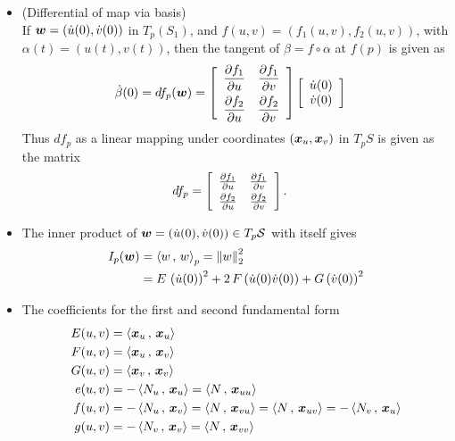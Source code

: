 \documentclass[11pt]{article}
\begin{document}
\begin{itemize}
\item (Differential of map via basis)\\
 If $\boldsymbol{w} = (\dot{u}(0), \dot{v}(0))$ in $T_{p}(S_{1})$,  and $f(u,v) = (f_{1}(u,v), f_{2}(u,v))$, with $\alpha(t) = (u(t), v(t))$, then the tangent of $\beta = f \circ \alpha$ at $f(p)$ is given as 
\begin{align}
 \dot{\beta}(0)= df_{p}(\boldsymbol{w}) &= \left[\begin{array}{cc}
 \dfrac{\partial f_{1}}{ \partial u} & \dfrac{\partial f_{1}}{ \partial v} \\ [8pt]
 \dfrac{\partial f_{2}}{ \partial u} & \dfrac{\partial f_{2}}{ \partial v}
 \end{array} \right] \left[\begin{array}{c}
 \dot{u}(0) \\ 
 \dot{v}(0)
 \end{array} \right] \label{eqn: diff_map_coord}
\end{align}
Thus $df_{p}$ as a linear mapping under coordinates $(\boldsymbol{x}_{u}, \boldsymbol{x}_{v})$ in $T_{p}S$ is given as the matrix 
\begin{align*}
df_{p}  &= \left[\begin{array}{cc}
 \frac{\partial f_{1}}{ \partial u} & \frac{\partial f_{1}}{ \partial v} \\[3pt] 
 \frac{\partial f_{2}}{ \partial u} & \frac{\partial f_{2}}{ \partial v}
 \end{array} \right].
\end{align*} \vspace{15pt}

\item The inner product of $\boldsymbol{w} = (\dot{u}(0), \dot{v}(0)) \in T_{p}{\mathcal S}$ with itself gives
\begin{align*}
I_{p}(\boldsymbol{w}) &= \left\langle w\,,\, w \right\rangle_{p} = \left\|w\right\|_{2}^{2}\\
&= E\,\left(\dot{u}(0)\right)^{2} + 2\,F\left(\dot{u}(0)\dot{v}(0)\right) + G\left(\dot{v}(0)\right)^{2}
\end{align*}




\item The coefficients for the first and second fundamental form
\begin{align}
E(u,v) &= \left\langle \boldsymbol{x}_{u}\,,\, \boldsymbol{x}_{u} \right\rangle \nonumber\\
F(u,v) &= \left\langle \boldsymbol{x}_{u}\,,\, \boldsymbol{x}_{v} \right\rangle \nonumber\\
G(u,v) &= \left\langle \boldsymbol{x}_{v}\,,\, \boldsymbol{x}_{v} \right\rangle \nonumber \\
e(u,v)  &=  - \left\langle N_{u}\,,\, \boldsymbol{x}_{u} \right\rangle = \left\langle N\,,\, \boldsymbol{x}_{uu} \right\rangle \nonumber\\
f(u, v)&= - \left\langle N_{u}\,,\, \boldsymbol{x}_{v} \right\rangle =  \left\langle N\,,\, \boldsymbol{x}_{vu} \right\rangle =  \left\langle N\,,\, \boldsymbol{x}_{uv} \right\rangle =  -\left\langle N_{v}\,,\, \boldsymbol{x}_{u} \right\rangle\nonumber\\
g(u, v)&=   - \left\langle N_{v}\,,\, \boldsymbol{x}_{v} \right\rangle = \left\langle N\,,\, \boldsymbol{x}_{vv} \right\rangle \label{eqn: coeff_first_sec_fund_form}
\end{align} 


\end{itemize}
\end{document}
